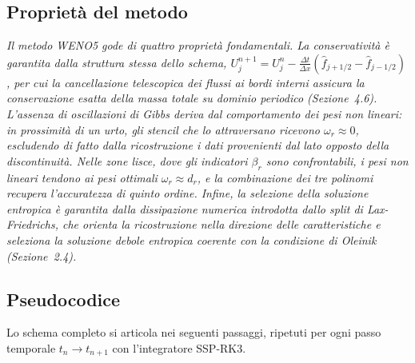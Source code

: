 \documentclass[12pt]{article}
\begin{document}
\subsection{Proprietà del metodo}

\textit{Il metodo WENO5 gode di quattro proprietà fondamentali. La conservatività è garantita dalla struttura stessa dello schema, $U_j^{n+1}=U_j^n-\frac{\Delta t}{\Delta x}(\hat f_{j+1/2}-\hat f_{j-1/2})$, per cui la cancellazione telescopica dei flussi ai bordi interni assicura la conservazione esatta della massa totale su dominio periodico (Sezione~4.6). L'assenza di oscillazioni di Gibbs deriva dal comportamento dei pesi non lineari: in prossimità di un urto, gli stencil che lo attraversano ricevono $\omega_r \approx 0$, escludendo di fatto dalla ricostruzione i dati provenienti dal lato opposto della discontinuità. Nelle zone lisce, dove gli indicatori $\beta_r$ sono confrontabili, i pesi non lineari tendono ai pesi ottimali $\omega_r \approx d_r$, e la combinazione dei tre polinomi recupera l'accuratezza di quinto ordine. Infine, la selezione della soluzione entropica è garantita dalla dissipazione numerica introdotta dallo split di Lax-Friedrichs, che orienta la ricostruzione nella direzione delle caratteristiche e seleziona la soluzione debole entropica coerente con la condizione di Oleinik (Sezione~2.4).}
\newpage


\subsection{Pseudocodice}

Lo schema completo si articola nei seguenti passaggi, ripetuti per ogni passo temporale \(t_n \to t_{n+1}\) con l'integratore SSP-RK3.
\end{document}
